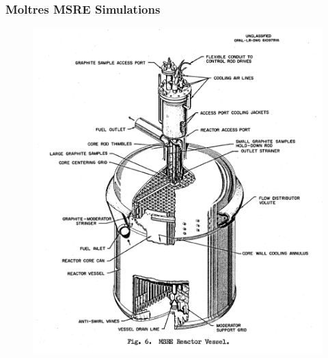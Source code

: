 \begin{frame}
  \frametitle{Moltres \gls{MSRE} Simulations}
              \begin{figure}[t]
               \hspace*{-0.25in}
                \includegraphics[height=0.65\textwidth]{./images/msre.png}
               \end{figure}   
\end{frame}

%	
